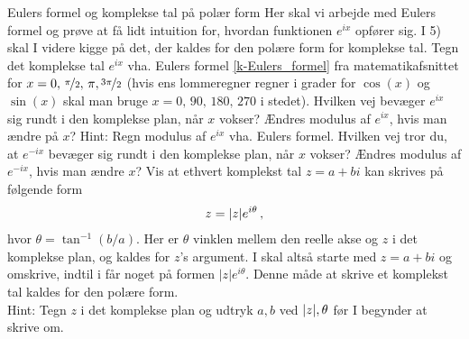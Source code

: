 \begin{opgave}[3]{Eulers formel og komplekse tal på polær form}
Her skal vi arbejde med Eulers formel og prøve at få lidt intuition for, hvordan funktionen $e^{ix}$ opfører sig. I 5) skal I videre kigge på det, der kaldes for den polære form for komplekse tal.
\opg Tegn det komplekse tal $e^{ix}$ vha. Eulers formel \eqref{k-Eulers_formel} fra matematikafsnittet for $x=0, \, \nicefrac{\pi}{2}, \, \pi, \nicefrac{3\pi}{2}$ (hvis ens lommeregner regner i grader for $\cos(x)$ og $\sin(x)$ skal man bruge $x=0, \, 90, \, 180, \, 270$ i stedet). Hvilken vej bevæger $e^{ix}$ sig rundt i den komplekse plan, når $x$ vokser?
\opg Ændres modulus af $e^{ix}$, hvis man ændre på $x$? Hint: Regn modulus af $e^{ix}$ vha. Eulers formel.
\opg Hvilken vej tror du, at $e^{-ix}$ bevæger sig rundt i den komplekse plan, når $x$ vokser?
\opg Ændres modulus af $e^{-ix}$, hvis man ændre $x$?
\opg Vis at ethvert komplekst tal $z = a+bi$ kan skrives på følgende form
\begin{align}
z = \abs{z}e^{i\theta} \, ,
\end{align} 
hvor $\theta = \tan^{-1}(b/a)$. Her er $\theta$ vinklen mellem den reelle akse og $z$ i det komplekse plan, og kaldes for $z$'s argument. I skal altså starte med $z=a+bi$ og omskrive, indtil i får noget på formen $|z|e^{i\theta}$. Denne måde at skrive et komplekst tal kaldes for den polære form.\\
Hint: Tegn $z$ i det komplekse plan og udtryk $a,b$ ved $\abs{z},\theta$ før I begynder at skrive om.
\end{opgave}
